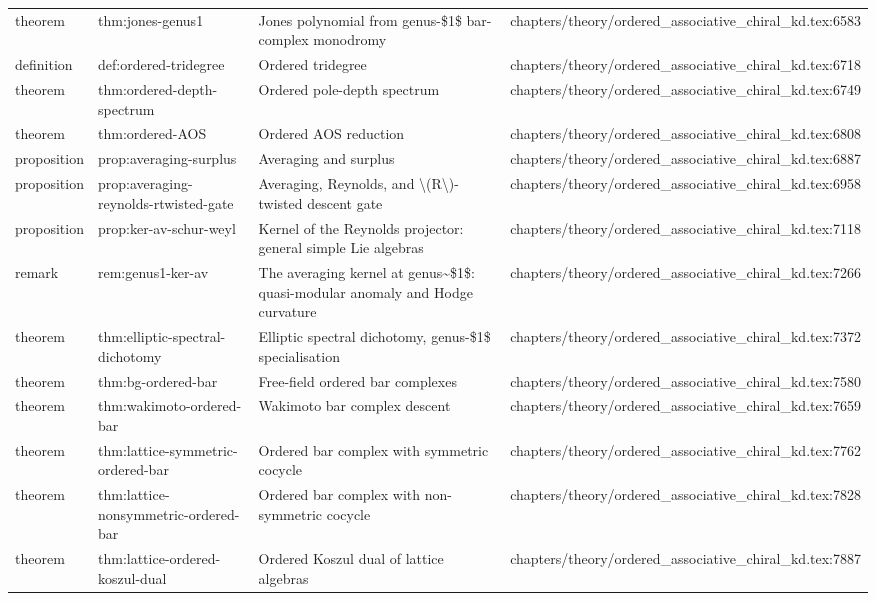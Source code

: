 \documentclass[11pt]{article}
\begin{document}
\begin{longtable}{L{0.10\textwidth}L{0.26\textwidth}L{0.42\textwidth}L{0.22\textwidth}}
theorem & thm:jones-genus1 & Jones polynomial from genus-\$1\$ bar-complex monodromy & chapters/theory/ordered\_associative\_chiral\_kd.tex:6583\\
definition & def:ordered-tridegree & Ordered tridegree & chapters/theory/ordered\_associative\_chiral\_kd.tex:6718\\
theorem & thm:ordered-depth-spectrum & Ordered pole-depth spectrum & chapters/theory/ordered\_associative\_chiral\_kd.tex:6749\\
theorem & thm:ordered-AOS & Ordered AOS reduction & chapters/theory/ordered\_associative\_chiral\_kd.tex:6808\\
proposition & prop:averaging-surplus & Averaging and surplus & chapters/theory/ordered\_associative\_chiral\_kd.tex:6887\\
proposition & prop:averaging-reynolds-rtwisted-gate & Averaging, Reynolds, and \textbackslash{}(R\textbackslash{})-twisted descent gate & chapters/theory/ordered\_associative\_chiral\_kd.tex:6958\\
proposition & prop:ker-av-schur-weyl & Kernel of the Reynolds projector: general simple Lie algebras & chapters/theory/ordered\_associative\_chiral\_kd.tex:7118\\
remark & rem:genus1-ker-av & The averaging kernel at genus\textasciitilde{}\$1\$: quasi-modular anomaly and Hodge curvature & chapters/theory/ordered\_associative\_chiral\_kd.tex:7266\\
theorem & thm:elliptic-spectral-dichotomy & Elliptic spectral dichotomy, genus-\$1\$ specialisation & chapters/theory/ordered\_associative\_chiral\_kd.tex:7372\\
theorem & thm:bg-ordered-bar & Free-field ordered bar complexes & chapters/theory/ordered\_associative\_chiral\_kd.tex:7580\\
theorem & thm:wakimoto-ordered-bar & Wakimoto bar complex descent & chapters/theory/ordered\_associative\_chiral\_kd.tex:7659\\
theorem & thm:lattice-symmetric-ordered-bar & Ordered bar complex with symmetric cocycle & chapters/theory/ordered\_associative\_chiral\_kd.tex:7762\\
theorem & thm:lattice-nonsymmetric-ordered-bar & Ordered bar complex with non-symmetric cocycle & chapters/theory/ordered\_associative\_chiral\_kd.tex:7828\\
theorem & thm:lattice-ordered-koszul-dual & Ordered Koszul dual of lattice algebras & chapters/theory/ordered\_associative\_chiral\_kd.tex:7887\\

\end{longtable}
\end{document}
